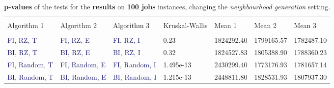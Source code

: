 \documentclass[
12pt,
a4paper,
oneside,
headinclude,
footinclude]{article}
\theoremstyle{definition} %
\begin{document}
\begin{table}[H]
    \hspace*{-2.5cm}
    \begin{tabular}{l l l l l l l} %
        \hline
        \hline 
        \\[-1.5ex]
        \textcolor{BrickRed}{Algorithm 1} & \textcolor{BrickRed}{Algorithm 2}  & \textcolor{BrickRed}{Algorithm 3} & \textcolor{BrickRed}{Kruskal-Wallis} & \textcolor{BrickRed}{Mean 1} & \textcolor{BrickRed}{Mean 2} & \textcolor{BrickRed}{Mean 3}\\ [0.5ex]
        \hline %
        \\[-1.5ex]
        
        \textcolor{MidnightBlue}{FI, RZ, T}     & \textcolor{MidnightBlue}{FI, RZ, E}     & \textcolor{MidnightBlue}{FI, RZ, I} & 0.23 & 1824292.40 & 1799165.57 & 1782487.10 \\ 
        \textcolor{MidnightBlue}{BI, RZ, T}     & \textcolor{MidnightBlue}{BI, RZ, E}     & \textcolor{MidnightBlue}{BI, RZ, I} & 0.32 & 1824527.83 & 1805388.90 & 1788360.23 \\ 
        \textcolor{MidnightBlue}{FI, Random, T} & \textcolor{MidnightBlue}{FI, Random, E} & \textcolor{MidnightBlue}{FI, Random, I} & 1.495e-13 & 2430299.40 & 1773176.93 & 1781657.14 \\ 
        \textcolor{MidnightBlue}{BI, Random, T} & \textcolor{MidnightBlue}{BI, Random, E} & \textcolor{MidnightBlue}{BI, Random, I} & 1.215e-13 & 2448811.80 & 1828531.93 & 1807937.30 \\ 
        [1ex] %
        \hline %
    \end{tabular}
    \caption{\label{tab:ii-n100res}\textbf{p-values} of the tests for the \textbf{results} on \textbf{100 jobs} instances, changing the \textit{neighbourhood generation} setting.}
\end{table} 
\end{document}
